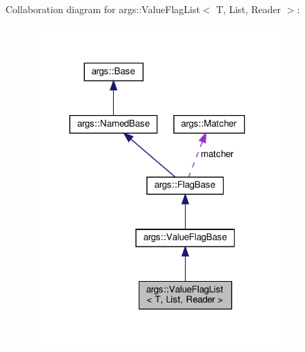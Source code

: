 Collaboration diagram for args\+:\+:Value\+Flag\+List$<$ T, List, Reader $>$\+:\nopagebreak
\begin{figure}[H]
\begin{center}
\leavevmode
\includegraphics[width=270pt]{classargs_1_1_value_flag_list__coll__graph}
\end{center}
\end{figure}
